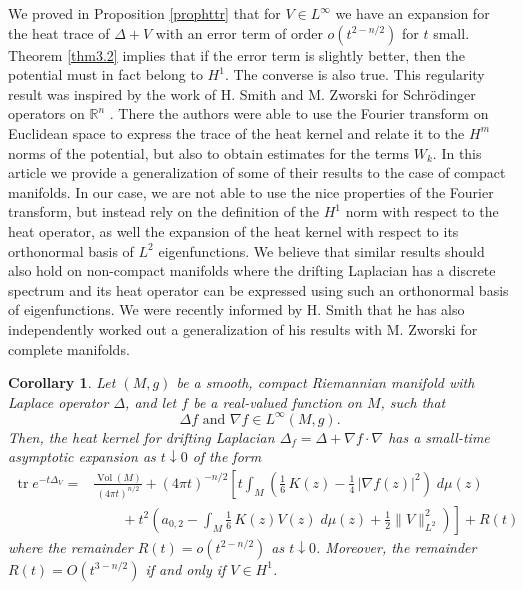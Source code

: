 \documentclass[letterpaper,12pt]{amsart}
\def \R{\mathbb R}
\def \n{\nabla}
\def \n{\nabla}
\newcommand{\tr}{\mathop{\mathrm{tr}}}
\newcommand{\Vol}{\operatorname{Vol}}
\newtheorem{cor}[thm]{Corollary}
\begin{document}
We proved in Proposition \ref{prophttr} that for $V\in L^\infty$ we have  an  expansion for the heat trace of $\Delta+V$  with an error term of order $ o(t^{2-n/2})$  for $t$ small. Theorem \ref{thm3.2} implies that if the error term is slightly better, then the potential must in fact belong to $H^1$. The converse is also true. This regularity result was inspired by the work of H. Smith and M. Zworski for Schr\"odinger operators on $\R^n$ \cite{smith-z}. There the authors were able to use the Fourier transform on Euclidean space to express the trace of the heat kernel and relate it to the $H^m$ norms of the potential, but also to obtain estimates for the terms $W_k$.  In this article we provide a generalization of some of their results to the case of compact manifolds. In our case, we are not able to use the nice properties of the Fourier transform, but instead  rely on the definition of the $H^1$ norm with respect to the heat operator, as well the expansion of the heat kernel with respect to its orthonormal basis of $L^2$ eigenfunctions. We believe that similar results should also hold on non-compact manifolds where the drifting Laplacian has a discrete spectrum and its heat operator can be expressed using such an orthonormal basis of eigenfunctions. We were recently informed by H. Smith that he has also independently worked out a generalization of his results with M. Zworski for complete manifolds.

\begin{cor} \label{httr_drift} Let $(M, g)$ be a smooth, compact Riemannian manifold with Laplace operator $\Delta$, and let $f$ be a real-valued function on $M$, such that
$$\Delta f \textrm{ and }  \nabla f \in L^\infty (M, g).$$
Then, the heat kernel for drifting Laplacian $\Delta_f = \Delta + \nabla f \cdot \nabla$ has a small-time asymptotic expansion as $t \downarrow 0$ of the form
\begin{equation*}
\begin{split}
\tr e^{-t\Delta_V}  =  & \frac{\Vol (M)}{(4\pi t)^{n/2}} + (4\pi t)^{-n/2} \left[ t \int_M \left(\frac{1}{6} \,   K(z)   -  \frac{1}{4} \, |\n f(z)|^2 \right) \; d\mu(z)   \right. \\
&\quad \quad + \left. t^2  \left( a_{0,2} - \int_M \frac{1}{6} \,   K(z) V(z)  \; d\mu(z) + \frac{1}{2} \|V\|_{L^2} ^2 \right) \right]+ R(t)
\end{split}
\end{equation*}
where the remainder $R(t) = o(t^{2-n/2})$ as $t \downarrow 0$.
Moreover, the remainder $R(t) = O(t^{3-n/2})$ if and only if $V \in H^1$.
\end{cor}
\end{document}
